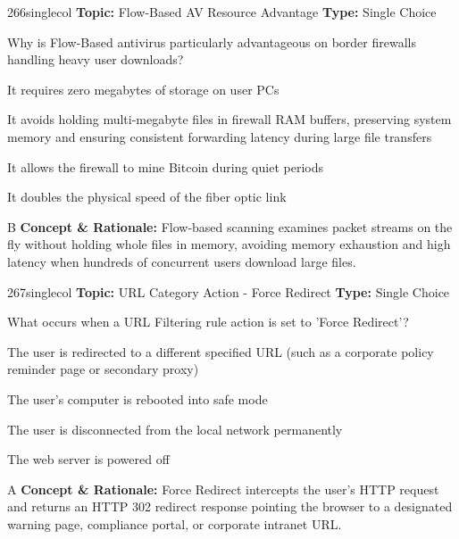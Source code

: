 \begin{qcard}{266}{singlecol}
\textcolor{darkslate!75}{\small\textbf{Topic:} Flow-Based AV Resource Advantage \hfill \textbf{Type:} Single Choice}\vspace{0.4em}\par
Why is Flow-Based antivirus particularly advantageous on border firewalls handling heavy user downloads?
\begin{qoptions}
\item It requires zero megabytes of storage on user PCs
\item It avoids holding multi-megabyte files in firewall RAM buffers, preserving system memory and ensuring consistent forwarding latency during large file transfers
\item It allows the firewall to mine Bitcoin during quiet periods
\item It doubles the physical speed of the fiber optic link
\end{qoptions}
\end{qcard}
\nopagebreak
\begin{explainbox}{B}
\textbf{Concept \& Rationale:} Flow-based scanning examines packet streams on the fly without holding whole files in memory, avoiding memory exhaustion and high latency when hundreds of concurrent users download large files.
\end{explainbox}

\begin{qcard}{267}{singlecol}
\textcolor{darkslate!75}{\small\textbf{Topic:} URL Category Action - Force Redirect \hfill \textbf{Type:} Single Choice}\vspace{0.4em}\par
What occurs when a URL Filtering rule action is set to 'Force Redirect'?
\begin{qoptions}
\item The user is redirected to a different specified URL (such as a corporate policy reminder page or secondary proxy)
\item The user's computer is rebooted into safe mode
\item The user is disconnected from the local network permanently
\item The web server is powered off
\end{qoptions}
\end{qcard}
\nopagebreak
\begin{explainbox}{A}
\textbf{Concept \& Rationale:} Force Redirect intercepts the user's HTTP request and returns an HTTP 302 redirect response pointing the browser to a designated warning page, compliance portal, or corporate intranet URL.
\end{explainbox}

